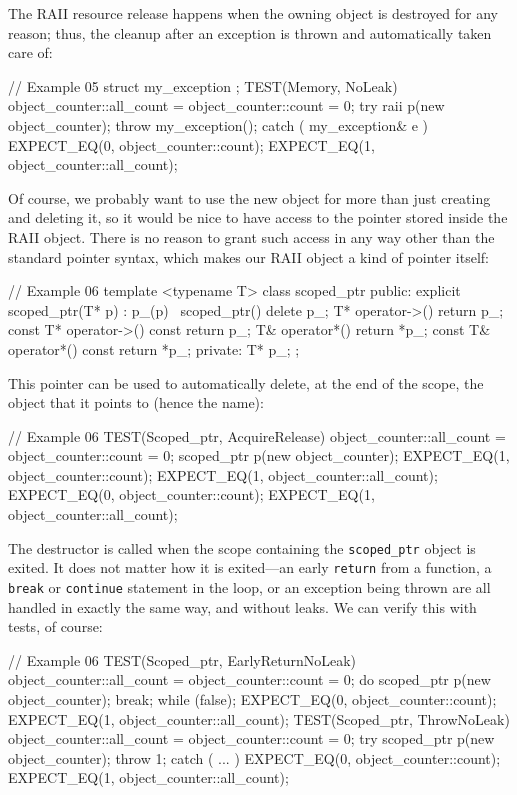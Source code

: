 The RAII resource release happens when the owning object is destroyed for any reason; thus, the cleanup after an exception is thrown and automatically taken care of:

\begin{code}
// Example 05
struct my_exception {};
TEST(Memory, NoLeak) {
  object_counter::all_count = object_counter::count = 0;
  try {
    raii p(new object_counter);
    throw my_exception();
  } catch ( my_exception& e ) {
  }
  EXPECT_EQ(0, object_counter::count);
  EXPECT_EQ(1, object_counter::all_count);
}
\end{code}

Of course, we probably want to use the new object for more than just creating and deleting it, so it would be nice to have access to the pointer stored inside the RAII object. There is no reason to grant such access in any way other than the standard pointer syntax, which makes our RAII object a kind of pointer itself:

\begin{code}
// Example 06
template <typename T> class scoped_ptr {
  public:
  explicit scoped_ptr(T* p) : p_(p) {}
  ~scoped_ptr() { delete p_; }
  T* operator->() { return p_; }
  const T* operator->() const { return p_; }
  T& operator*() { return *p_; }
  const T& operator*() const { return *p_; }
  private:
  T* p_;
};
\end{code}

This pointer can be used to automatically delete, at the end of the scope, the object that it points to (hence the name):

\begin{code}
// Example 06
TEST(Scoped_ptr, AcquireRelease) {
  object_counter::all_count = object_counter::count = 0;
  {
    scoped_ptr p(new object_counter);
    EXPECT_EQ(1, object_counter::count);
    EXPECT_EQ(1, object_counter::all_count);
  }
  EXPECT_EQ(0, object_counter::count);
  EXPECT_EQ(1, object_counter::all_count);
}
\end{code}

The destructor is called when the scope containing the \texttt{scoped\_ptr} object is exited. It does not matter how it is exited---an early \texttt{return} from a function, a \texttt{break} or \texttt{continue} statement in the loop, or an exception being thrown are all handled in exactly the same way, and without leaks. We can verify this with tests, of course:

\begin{code}
// Example 06
TEST(Scoped_ptr, EarlyReturnNoLeak) {
  object_counter::all_count = object_counter::count = 0;
  do {
    scoped_ptr p(new object_counter);
    break;
  } while (false);
  EXPECT_EQ(0, object_counter::count);
  EXPECT_EQ(1, object_counter::all_count);
}
TEST(Scoped_ptr, ThrowNoLeak) {
  object_counter::all_count = object_counter::count = 0;
  try {
    scoped_ptr p(new object_counter);
   throw 1;
  } catch ( ... ) {}
  EXPECT_EQ(0, object_counter::count);
  EXPECT_EQ(1, object_counter::all_count);
}
\end{code}

